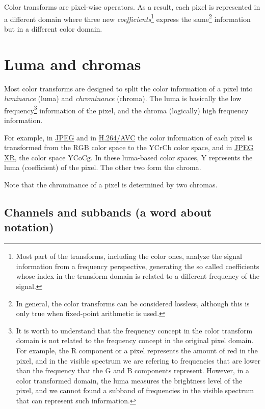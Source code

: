 Color transforms are pixel-wise operators. As a result, each pixel is
represented in a different domain where three new
\emph{coefficients}\footnote{Most part of the transforms, including
the color ones, analyze the signal information from a frequency
perspective, generating the so called coefficients whose index in the
transform domain is related to a different frequency of the signal.}
express the same\footnote{In general, the color transforms can be
considered lossless, although this is only true when fixed-point
arithmetic is used.} information but in a different color domain.

\section{Luma and chromas}

Most color transforms are designed to split the color information of a
pixel into \emph{luminance} (luma) and \emph{chrominance} (chroma). The
luma is basically the low frequency\footnote{It is worth to understand
  that the frequency concept in the color transform domain is not
  related to the frequency concept in the original pixel domain. For
  example, the $\text{R}$ component or a pixel represents the amount
  of red in the pixel, and in the visible spectrum we are refering to
  frequencies that are lower than the frequency that the $\text{G}$
  and $\text{B}$ components represent. However, in a color transformed
  domain, the luma measures the brightness level of the pixel, and we
  cannot found a subband of frequencies in the visible spectrum that
  can represent such information.} information of the pixel, and the
chroma (logically) high frequency information.

For example, in
\href{https://en.wikipedia.org/wiki/JPEG#JPEG_codec_example}{JPEG} and
in
\href{https://en.wikipedia.org/wiki/Advanced_Video_Coding#Fidelity_range_extensions_and_professional_profiles}{H.264/AVC}
the color information of each pixel is transformed from the
$\text{RGB}$ color space to the $\text{YCrCb}$ color space, and in
\href{https://en.wikipedia.org/wiki/JPEG_XR#Description}{JPEG XR}, the
color space $\text{YCoCg}$. In these luma-based color spaces,
$\text{Y}$ represents the luma (coefficient) of the pixel. The other
two form the chroma.

Note that the chrominance of a pixel is determined by two chromas.

\subsection*{Channels and subbands (a word about notation)}

